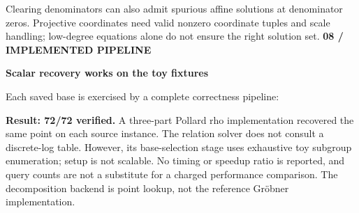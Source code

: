 \documentclass[11pt]{article}
\newcommand{\titleline}[2]{{\small\color{teal}\textbf{#1}}\par{\LARGE\color{ink}\textbf{#2}}\par\vspace{3mm}}
\begin{document}
\begin{center}\end{center}
Clearing denominators can also admit spurious affine solutions at denominator zeros. Projective coordinates need valid nonzero coordinate tuples and scale handling; low-degree equations alone do not ensure the right solution set.
\newpage
\titleline{08 / IMPLEMENTED PIPELINE}{Scalar recovery works on the toy fixtures}
Each saved base is exercised by a complete correctness pipeline:
\begin{center}\end{center}
\textbf{Result: 72/72 verified.} A three-part Pollard rho implementation recovered the same point on each source instance. The relation solver does not consult a discrete-log table. However, its base-selection stage uses exhaustive toy subgroup enumeration; setup is not scalable. No timing or speedup ratio is reported, and query counts are not a substitute for a charged performance comparison. The decomposition backend is point lookup, not the reference Gr\"obner implementation.
\end{document}
